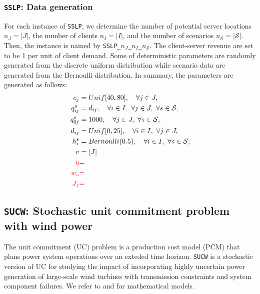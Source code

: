 \subsubsection{\texttt{SSLP}: Data generation}
For each instance of \texttt{SSLP}, we determine the number of potential server locations $n_J=|J|$, the number of clients $n_I=|I|$, and the number of scenarios $n_\mathcal{S}=|\mathcal{S}|$. Then, the instance is named by \texttt{SSLP\_$n_J$\_$n_I$\_$n_\mathcal{S}$}. The client-server revenue are set to be 1 per unit of client demand. Some of deterministic parameters are randomly generated from the discrete uniform distribution while scenario data are generated from the Bernoulli distribution. In summary, the parameters are generated as follows:
\begin{align*}
c_j	&=Unif[40,80],\quad\forall j\in J,\\
q_{ij}^s	&= d_{ij},\quad\forall i\in I,\ \forall j\in J,\ \forall s\in\mathcal{S},\\
q_{0j}^s	&=	1000,\quad\forall j\in J,\ \forall s\in\mathcal{S},\\
d_{ij}	&= Unif[0,25],\quad\forall i\in I,\ \forall j\in J,\\
h_i^s	&= Bernoulli(0.5),\quad\forall i\in I,\ \forall s\in \mathcal{S},\\
v 		&= |J|	\\
\textcolor{red}{u	}&\textcolor{red}{=		}\\
\textcolor{red}{w_z	}&\textcolor{red}{=		}\\
\textcolor{red}{J_z	}&\textcolor{red}{=	}
\end{align*}



\subsection{\texttt{SUCW}: Stochastic unit commitment problem with wind power} \label{SUCW}
The unit commitment (UC) problem is a production cost model (PCM) that plans power system operations over an exteded time horizon. \texttt{SUCW} is a stochastic version of UC for studying the impact of incorporating highly uncertain power generation of large-scale wind turbines with transmission constraints and system component failures. We refer to \cite{journal:PO2013} and \cite{journal:KZ2015} for mathematical models.
